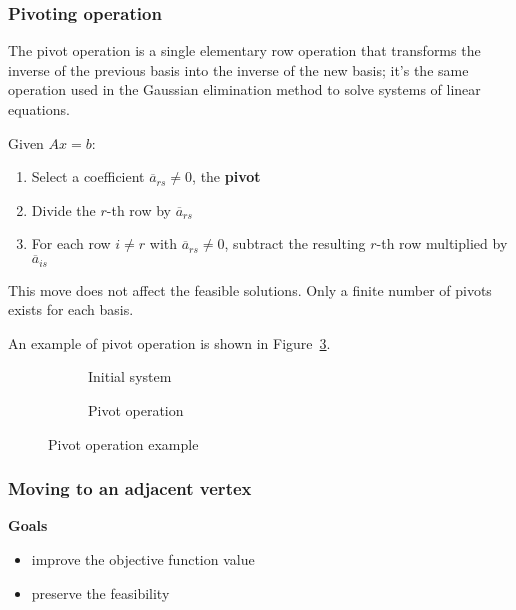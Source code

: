 \documentclass[english]{article}
\begin{document}
\subsubsection{Pivoting operation}

The pivot operation is a single elementary row operation that transforms the inverse of the previous basis into the inverse of the new basis;
it's the same operation used in the Gaussian elimination method to solve systems of linear equations.

\bigskip
Given \(Ax = b\):

\begin{enumerate}
  \item Select a coefficient \(\overline{a}_{rs} \neq 0\), the \textbf{pivot}
  \item Divide the \(r\)-th row by \(\overline{a}_{rs}\)
  \item For each row \(i \neq r\) with \(\overline{a}_{rs} \neq 0\), subtract the resulting \(r\)-th row multiplied by \(\overline{a}_{is}\)
\end{enumerate}

This move does not affect the feasible solutions.
Only a finite number of pivots exists for each basis.

\bigskip
An example of pivot operation is shown in Figure~\ref{fig:pivot-operation-example}.

\begin{figure}[htbp]
  \centering
  \bigskip
  \begin{subfigure}[b]{0.495\textwidth}
    \centering
    \bigskip
    \caption{Initial system}
    \label{fig:pivot-operation-example-1}
    \bigskip
  \end{subfigure}
  \begin{subfigure}[b]{0.495\textwidth}
    \centering
    \bigskip
    \caption{Pivot operation}
    \bigskip
    \label{fig:pivot-operation-example-2}
  \end{subfigure}

  \caption{Pivot operation example}
  \label{fig:pivot-operation-example}
  \bigskip
\end{figure}

\subsubsection{Moving to an adjacent vertex}

\textbf{Goals}
\begin{itemize}[label=\(\rightarrow\)]
  \item improve the objective function value
  \item preserve the feasibility
\end{itemize}
\end{document}
